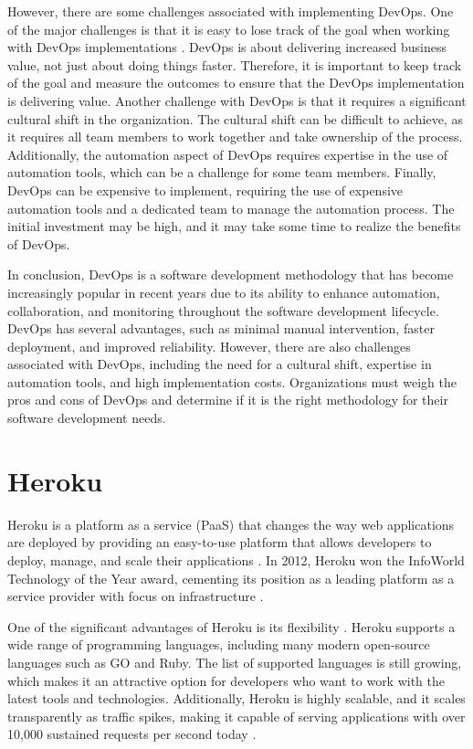 However, there are some challenges associated with implementing DevOps. One of the major challenges is that it is easy to lose track of the goal when working with DevOps implementations \cite{joakim}. DevOps is about delivering increased business value, not just about doing things faster. Therefore, it is important to keep track of the goal and measure the outcomes to ensure that the DevOps implementation is delivering value. Another challenge with DevOps is that it requires a significant cultural shift in the organization. The cultural shift can be difficult to achieve, as it requires all team members to work together and take ownership of the process. Additionally, the automation aspect of DevOps requires expertise in the use of automation tools, which can be a challenge for some team members. Finally, DevOps can be expensive to implement, requiring the use of expensive automation tools and a dedicated team to manage the automation process. The initial investment may be high, and it may take some time to realize the benefits of DevOps.

In conclusion, DevOps is a software development methodology that has become increasingly popular in recent years due to its ability to enhance automation, collaboration, and monitoring throughout the software development lifecycle. DevOps has several advantages, such as minimal manual intervention, faster deployment, and improved reliability. However, there are also challenges associated with DevOps, including the need for a cultural shift, expertise in automation tools, and high implementation costs. Organizations must weigh the pros and cons of DevOps and determine if it is the right methodology for their software development needs.

\section{Heroku}
Heroku is a platform as a service (PaaS) that changes the way web applications are deployed by providing an easy-to-use platform that allows developers to deploy, manage, and scale their applications \cite{mike}. In 2012, Heroku won the InfoWorld Technology of the Year award, cementing its position as a leading platform as a service provider with focus on infrastructure \cite{greengard, news}.

One of the significant advantages of Heroku is its flexibility \cite{greengard, anubhav, patrick}. Heroku supports a wide range of programming languages, including many modern open-source languages such as GO and Ruby. The list of supported languages is still growing, which makes it an attractive option for developers who want to work with the latest tools and technologies. Additionally, Heroku is highly scalable, and it scales transparently as traffic spikes, making it capable of serving applications with over 10,000 sustained requests per second today \cite{anubhav}.

